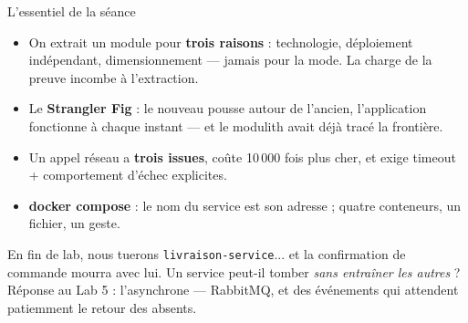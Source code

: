 \documentclass[aspectratio=169,11pt]{beamer}
\begin{document}
\begin{frame}{L'essentiel de la séance}
\begin{ucadret}[À retenir]
{\footnotesize
\begin{itemize}
  \item On extrait un module pour \textbf{trois raisons} : technologie, déploiement indépendant, dimensionnement — jamais pour la mode. La charge de la preuve incombe à l'extraction.
  \item Le \textbf{Strangler Fig} : le nouveau pousse autour de l'ancien, l'application fonctionne à chaque instant — et le modulith avait déjà tracé la frontière.
  \item Un appel réseau a \textbf{trois issues}, coûte 10\,000 fois plus cher, et exige timeout + comportement d'échec explicites.
  \item \textbf{docker compose} : le nom du service est son adresse ; quatre conteneurs, un fichier, un geste.
\end{itemize}}
\end{ucadret}
\begin{ucadfront}
{\footnotesize En fin de lab, nous tuerons \texttt{livraison-service}... et la confirmation de commande mourra avec lui. Un service peut-il tomber \emph{sans entraîner les autres} ? Réponse au Lab 5 : l'asynchrone — RabbitMQ, et des événements qui attendent patiemment le retour des absents.}
\end{ucadfront}
\end{frame}
\end{document}
